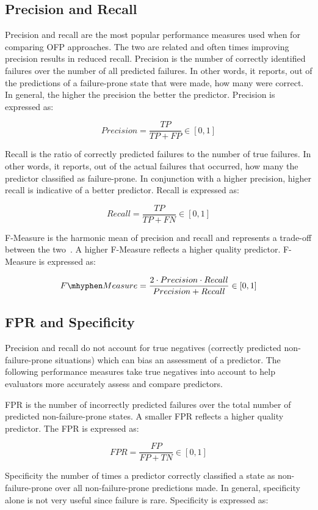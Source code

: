 \subsection{Precision and Recall}
Precision and recall are the most popular performance measures used when
for comparing \ac{OFP} approaches.  The two are related and often times
improving precision results in reduced recall.  Precision is the number of
correctly identified failures over the number of all predicted failures.  In
other words, it reports, out of the predictions of a failure-prone state that
were made, how many were correct.  In general, the higher the precision the
better the predictor.  Precision is expressed as:

\[ Precision 
	= \dfrac{TP}{TP + FP} \in [0,1]
\]

Recall is the ratio of correctly predicted failures to the number of true
failures.  In other words, it reports, out of the actual failures that
occurred, how many the predictor classified as failure-prone.  In conjunction
with a higher precision, higher recall is indicative of a better predictor.
Recall is expressed as:

\[ Recall 
	= \dfrac{TP}{TP + FN} \in [0,1]
\]

F-Measure is the harmonic mean of precision and recall and represents a
trade-off between the two~\cite{rijsbergen1979v}.  A higher F-Measure reflects
a higher quality predictor.  F-Measure is expressed as:

\[ F\mhyphen Measure 
	= \dfrac{2 \cdot Precision \cdot Recall}{Precision + Recall} \in [0,1]
\]

\subsection{\ac{FPR} and Specificity}
Precision and recall do not account for true negatives (correctly predicted
non-failure-prone situations) which can bias an assessment of a predictor.  The
following performance measures take true negatives into account to help
evaluators more accurately assess and compare predictors.

\ac{FPR} is the number of incorrectly predicted failures over the total number
of predicted non-failure-prone states.  A smaller \ac{FPR} reflects a higher
quality predictor.  The \ac{FPR} is expressed as:

\[ \mathit{FPR}
	= \dfrac{FP}{FP + TN} \in [0,1]
\]

Specificity the number of times a predictor correctly classified a state as
non-failure-prone over all non-failure-prone predictions made.  In general,
specificity alone is not very useful since failure is rare.  Specificity is
expressed as:

